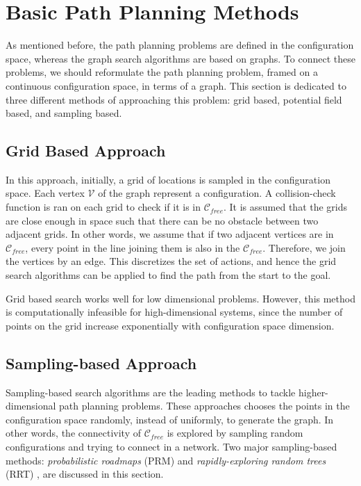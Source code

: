 \section{Basic Path Planning Methods}
\label{sec:basic_motion_planning}
As mentioned before, the path planning problems are defined in the configuration space, whereas the graph search algorithms are based on graphs. To connect these problems, we should reformulate the path planning problem, framed on a continuous configuration space, in terms of a graph. This section is dedicated to three different methods of approaching this problem: grid based, potential field based, and sampling based.
\subsection{Grid Based Approach}
\label{sec:grid_search}
In this approach, initially, a grid of locations is sampled in the configuration space. Each vertex $\mathcal{V}$ of the graph represent a configuration. A collision-check function is ran on each grid to check if it is in $\mathcal{C}_{free}$. It is assumed that the grids are close enough in space such that there can be no obstacle between two adjacent grids. In other words, we assume that if two adjacent vertices are in $\mathcal{C}_{free}$, every point in the line joining them is also in the $\mathcal{C}_{free}$. Therefore, we join the vertices by an edge. This discretizes the set of actions, and hence the grid search algorithms can be applied to find the path from the start to the goal. 

Grid based search works well for low dimensional problems. However, this method is computationally infeasible for high-dimensional systems, since the number of points on the grid increase exponentially with configuration space dimension. 

\subsection{Sampling-based Approach}
\label{sec:sampling_search}
Sampling-based search algorithms are the leading methods to tackle higher-dimensional path planning problems. These approaches chooses the points in the configuration space randomly, instead of uniformly, to generate the graph. In other words, the connectivity of $\mathcal{C}_{free}$ is explored by sampling random configurations and trying to connect in a network. Two major sampling-based methods: \textit{probabilistic roadmaps} (PRM) \cite{kavraki1994probabilistic} and \textit{rapidly-exploring random trees} (RRT) \cite{lavalle2006planning}, are discussed in this section.

